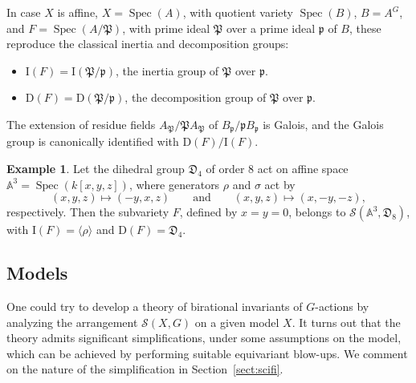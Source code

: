 \documentclass[12pt,reqno]{amsart}
\theoremstyle{plain}
\theoremstyle{remark}
\theoremstyle{definition}
\newtheorem{exam}[prop]{Example}
\numberwithin{equation}{section}
\newcommand{\A}{{\mathbb A}}
\newcommand{\cS}{{\mathcal S}}
\DeclareMathOperator{\Spec}{Spec}
\begin{document}
In case $X$ is affine, $X=\Spec(A)$, with quotient variety $\Spec(B)$, $B=A^G$, and $F=\Spec(A/\mathfrak{P})$, with prime ideal $\mathfrak{P}$ over a prime ideal $\mathfrak{p}$ of $B$, these reproduce the classical inertia and decomposition groups:
\begin{itemize}
\item $\mathrm{I}(F)=\mathrm{I}(\mathfrak{P}/\mathfrak{p})$, the inertia group of $\mathfrak{P}$ over $\mathfrak{p}$.
\item $\mathrm{D}(F)=\mathrm{D}(\mathfrak{P}/\mathfrak{p})$, the decomposition group of $\mathfrak{P}$ over $\mathfrak{p}$.
\end{itemize}
The extension of residue fields
$A_{\mathfrak{P}}/\mathfrak{P}A_{\mathfrak{P}}$ of
$B_{\mathfrak{p}}/\mathfrak{p}B_{\mathfrak{p}}$ is Galois, and the Galois group is canonically identified with $\mathrm{D}(F)/\mathrm{I}(F)$.

\begin{exam}
\label{exa.notcentral}
Let the dihedral group $\mathfrak{D}_4$ of order $8$ act on affine space $\A^3=\Spec(k[x,y,z])$, where generators $\rho$ and $\sigma$ act by
\[ (x,y,z)\mapsto (-y,x,z)\qquad\text{and}\qquad (x,y,z)\mapsto (x,-y,-z), \]
respectively.
Then the subvariety $F$, defined by $x=y=0$, belongs to $\mathcal{S}(\A^3,\mathfrak{D}_8)$, with $\mathrm{I}(F)=\langle \rho\rangle$ and $\mathrm{D}(F)=\mathfrak{D}_4$.
\end{exam}





\subsection{Models}
\label{sect:standardf}
One could try to develop a theory of birational invariants of $G$-actions by analyzing the arrangement
$\cS(X,G)$
on a given model $X$. It turns out that the theory admits significant simplifications, under some assumptions on the model, which can be achieved by performing suitable equivariant blow-ups.
We comment on the nature of the simplification in Section~\ref{sect:scifi}.
\end{document}
